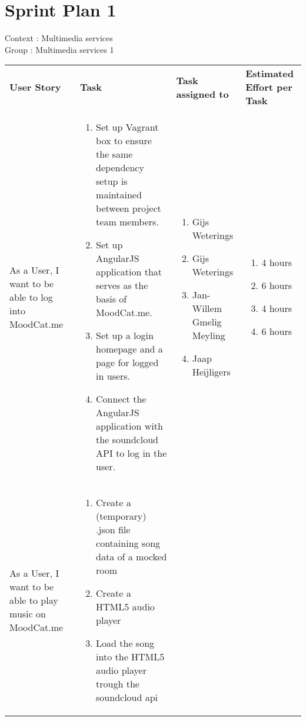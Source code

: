 \documentclass[11pt,a4paper]{article}
\begin{document}
\section*{Sprint Plan 1}
Context : Multimedia services\\
Group : Multimedia services 1\\



\begin{table}[h]
\begin{tabular}{|p{4.5cm}|p{7cm}|p{4cm}|p{2.6cm}|}
\textbf{User Story} & \textbf{Task} & \textbf{Task assigned to} & \textbf{Estimated Effort per Task} \\
As a User, I want to be able to log into MoodCat.me & \begin{enumerate}
\item Set up Vagrant box to ensure the same dependency setup is maintained between project team members.
\item Set up AngularJS application that serves as the basis of MoodCat.me.
\item Set up a login homepage and a page for logged in users.
\item Connect the AngularJS application with the soundcloud API to log in the user.
\end{enumerate}

& 
\begin{enumerate}
\item Gijs Weterings
\item Gijs Weterings
\item Jan-Willem Gmelig Meyling
\item Jaap Heijligers 
\end{enumerate}

& 
\begin{enumerate}
\item 4 hours
\item 6 hours
\item 4 hours
\item 6 hours
\end{enumerate} \\

As a User, I want to be able to play music on MoodCat.me & \begin{enumerate}
\item Create a (temporary) .json file containing song data of a mocked room
\item Create a HTML5 audio player 
\item Load the song into the HTML5 audio player trough the soundcloud api
\end{enumerate}


\end{tabular}
\end{table}
\end{document}
